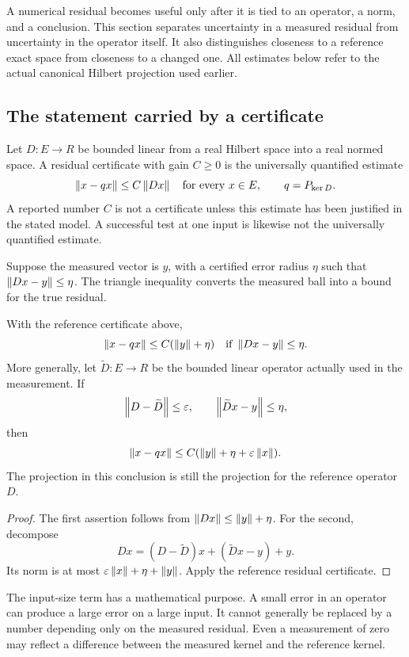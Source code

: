 \label{KS:sec:certificate-reading}
A numerical residual becomes useful only after it is tied to an operator, a norm, and a conclusion. This section separates uncertainty in a measured residual from uncertainty in the operator itself. It also distinguishes closeness to a reference exact space from closeness to a changed one. All estimates below refer to the actual canonical Hilbert projection used earlier.

\subsection{The statement carried by a certificate}
Let \(D:E\to R\) be bounded linear from a real Hilbert space into a real normed space. A residual certificate with gain \(C\ge0\) is the universally quantified estimate
\[
 \left\lVert x-qx\right\rVert\le C\left\lVert Dx\right\rVert\quad\text{for every }x\in E,
 \qquad q=P_{\ker D}.
\]
A reported number \(C\) is not a certificate unless this estimate has been justified in the stated model. A successful test at one input is likewise not the universally quantified estimate.

Suppose the measured vector is \(y\), with a certified error radius \(\eta\) such that \(\left\lVert Dx-y\right\rVert\le\eta\). The triangle inequality converts the measured ball into a bound for the true residual.

\begin{KSproposition}\label{KS:KS69}
With the reference certificate above,
\[
 \left\lVert x-qx\right\rVert\le C(\left\lVert y\right\rVert+\eta)
 \quad\text{if }\left\lVert Dx-y\right\rVert\le\eta.
\]
More generally, let \(\widetilde D:E\to R\) be the bounded linear operator actually used in the measurement. If
\[
 \left\lVert D-\widetilde D\right\rVert\le\varepsilon,
 \qquad\left\lVert\widetilde D x-y\right\rVert\le\eta,
\]
then
\begin{equation}\label{KS:eq:measured-reference}
 \left\lVert x-qx\right\rVert\le C(\left\lVert y\right\rVert+\eta+\varepsilon\left\lVert x\right\rVert).
\end{equation}
The projection in this conclusion is still the projection for the reference operator \(D\).
\end{KSproposition}
\begin{proof}
The first assertion follows from \(\left\lVert Dx\right\rVert\le\left\lVert y\right\rVert+\eta\). For the second, decompose
\[
 Dx=(D-\widetilde D)x+(\widetilde D x-y)+y.
\]
Its norm is at most \(\varepsilon\left\lVert x\right\rVert+\eta+\left\lVert y\right\rVert\). Apply the reference residual certificate.
\end{proof}
The input-size term has a mathematical purpose. A small error in an operator can produce a large error on a large input. It cannot generally be replaced by a number depending only on the measured residual. Even a measurement of zero may reflect a difference between the measured kernel and the reference kernel.

